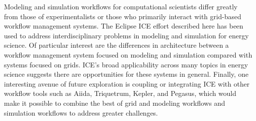 Modeling and simulation workflows for computational scientists differ greatly
from those of experimentalists or those who primarily interact with grid-based workflow
management systems. The Eclipse ICE effort described here has been used to
address interdisciplinary problems in modeling and simulation for energy
science. Of particular interest are the differences in architecture between a
workflow management system focused on modeling and simulation compared with
systems focused on grids. ICE's broad applicability across many topics in energy
science suggests there are opportunities for these systems in general. Finally,
one interesting avenue of future exploration is coupling or integrating ICE with
other workflow tools such as Aiida, Triquetrum, Kepler, and Pegasus, which would
make it possible to combine the best of grid and modeling workflows and
simulation workflows to address greater challenges.